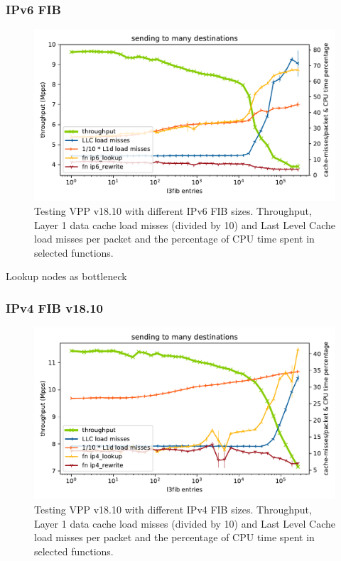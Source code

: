 \begin{frame}
    \frametitle{IPv6 FIB}
    \begin{figure}[!ht]
    \noindent\hspace{0.5mm}\includegraphics[width=\linewidth]{pics/throughput_l3v6_routes_klaipeda32ghz_v3.pdf}
    \caption{Testing VPP v18.10 with different IPv6 FIB sizes. Throughput, Layer 1 data cache load misses (divided by 10) and Last Level Cache load misses per packet and the percentage of CPU time spent in selected functions. }
    \label{graph:ip6fib}
    \end{figure}
    Lookup nodes as bottleneck
\end{frame}

\begin{frame}
    \frametitle{IPv4 FIB v18.10}
    \begin{figure}[!ht]
    \noindent\hspace{0.5mm}\includegraphics[width=\linewidth]{pics/throughput_l3_routes_klaipeda32ghz_v3.pdf}
    \caption{Testing VPP v18.10 with different IPv4 FIB sizes. Throughput, Layer 1 data cache load misses (divided by 10) and Last Level Cache load misses per packet and the percentage of CPU time spent in selected functions.}
    \label{graph:ip4fib}
    \end{figure}
\end{frame}


